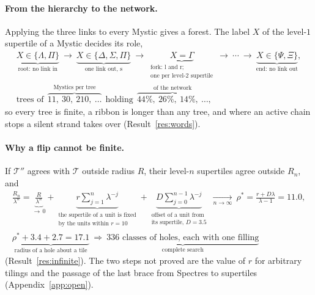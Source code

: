 \documentclass[11pt]{article}
\theoremstyle{definition}
\begin{document}
\paragraph{From the hierarchy to the network.} Applying the three links to every Mystic gives a forest. The label $X$ of the level-$1$ supertile of a Mystic decides its role,
\begin{equation}\label{eq:fit-forest}
\begin{gathered}
\underbrace{X\in\{\Lambda,\Pi\}}_{\text{root: no link in}}\ \longrightarrow\
\underbrace{X\in\{\Delta,\Sigma,\Pi\}}_{\text{one link out, } \mathrm s}\ \longrightarrow\
\underbrace{X=\Gamma}_{\substack{\text{fork: } \mathrm l \text{ and } \mathrm r;\\ \text{one per level-2 supertile}}}\ \longrightarrow\ \cdots\ \longrightarrow\
\underbrace{X\in\{\Psi,\Xi\}}_{\text{end: no link out}},\\[4pt]
\text{trees of}\ \ \overbrace{11,\ 30,\ 210,\ \dots}^{\text{Mystics per tree}}\ \ \text{holding}\ \ \overbrace{44\%,\ 26\%,\ 14\%,\ \dots}^{\text{of the network}} ,
\end{gathered}
\end{equation}
so every tree is finite, a ribbon is longer than any tree, and where an active chain stops a silent strand takes over (Result~\ref{res:words}).

\paragraph{Why a flip cannot be finite.} If $\mathcal{T}''$ agrees with $\mathcal{T}$ outside radius $R$, their level-$n$ supertiles agree outside $R_n$, and
\begin{equation}\label{eq:fit-confine}
\begin{gathered}
\frac{R_n}{\lambda^n}
=\underbrace{\frac{R}{\lambda^n}}_{\to\,0}
+\underbrace{r\sum_{j=1}^{n}\lambda^{-j}}_{\substack{\text{the supertile of a unit is fixed}\\ \text{by the units within } r=10}}
+\underbrace{D\sum_{j=0}^{n-1}\lambda^{-j}}_{\substack{\text{offset of a unit from}\\ \text{its supertile, } D=3.5}}
\ \xrightarrow[n\to\infty]{}\ \rho^*=\frac{r+D\lambda}{\lambda-1}=11.0 ,\\[4pt]
\underbrace{\rho^*+3.4+2.7=17.1}_{\text{radius of a hole about a tile}}
\ \Longrightarrow\
\underbrace{336 \text{ classes of holes, each with one filling}}_{\text{complete search}}
\end{gathered}
\end{equation}
(Result~\ref{res:infinite}). The two steps not proved are the value of $r$ for arbitrary tilings and the passage of the last brace from Spectres to supertiles (Appendix~\ref{app:open}).
\end{document}
